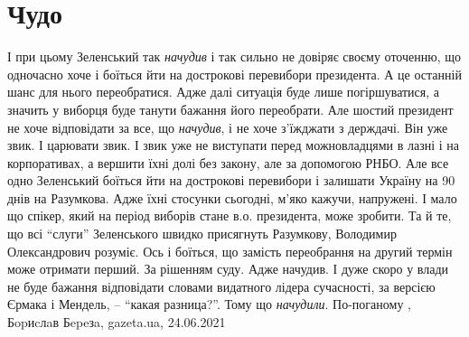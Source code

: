  
 
 
 
 
\chapter{Чудо}

І при цьому Зеленський так \emph{начудив} і так сильно не довіряє своєму оточенню, що
одночасно хоче і боїться йти на дострокові перевибори президента. А це останній
шанс для нього переобратися. Адже далі ситуація буде лише погіршуватися, а
значить у виборця буде танути бажання його переобрати. Але шостий президент не
хоче відповідати за все, що \emph{начудив}, і не хоче з'їжджати з держдачі. Він уже
звик. І царювати звик. І звик уже не виступати перед можновладцями в лазні і на
корпоративах, а вершити їхні долі без закону, але за допомогою РНБО. Але все
одно Зеленський боїться йти на дострокові перевибори і залишати Україну на 90
днів на Разумкова. Адже їхні стосунки сьогодні, м'яко кажучи, напружені. І мало
що спікер, який на період виборів стане в.о. президента, може зробити. Та й те,
що всі \enquote{слуги} Зеленського швидко присягнуть Разумкову, Володимир Олександрович
розуміє. Ось і боїться, що замість переобрання на другий термін може отримати
перший. За рішенням суду. Адже начудив.  І дуже скоро у влади не буде бажання
відповідати словами видатного лідера сучасності, за версією Єрмака і Мендель, –
\enquote{какая разница?}. Тому що \emph{начудили}. По-поганому
, 
Бopиcлaв Бepeзa, gazeta.ua, 24.06.2021

